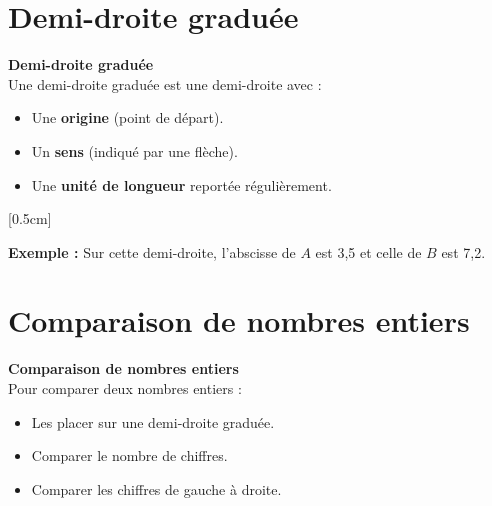 \section{Demi-droite graduée}

\begin{definitionbox}
  \textbf{Demi-droite graduée} \\
  Une demi-droite graduée est une demi-droite avec :
  \begin{itemize}[label = \textbullet]
    \item Une \textbf{origine} (point de départ).
    \item Un \textbf{sens} (indiqué par une flèche).
    \item Une \textbf{unité de longueur} reportée régulièrement.
  \end{itemize}
\end{definitionbox}

\begin{center}
\end{center}

[0.5cm]

\textbf{Exemple :} Sur cette demi-droite, l'abscisse de $A$ est 3,5 et celle de $B$ est 7,2.

\section{Comparaison de nombres entiers}

\begin{definitionbox}
  \textbf{Comparaison de nombres entiers} \\
  Pour comparer deux nombres entiers :
  \begin{itemize}
    \item Les placer sur une demi-droite graduée.
    \item Comparer le nombre de chiffres.
    \item Comparer les chiffres de gauche à droite.
  \end{itemize}
\end{definitionbox}


